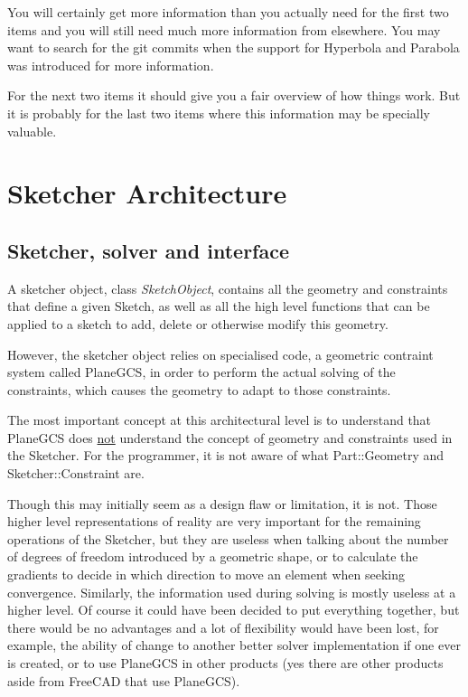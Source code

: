 \documentclass[12pt,twoside,a4paper]{book}
\newcommand{\SketchObject}{\emph{SketchObject}}
\newenvironment{tolerant}[1]{%
  \par\tolerance=#1\relax
}{%
  \par
}
\begin{document}
    You will certainly get more information than you actually need for the first two items and you will still need much more information from elsewhere. You may want to search for the git commits when the support for Hyperbola and Parabola was introduced for more information.

    For the next two items it should give you a fair overview of how things work. But it is probably for the last two items where this information may be specially valuable.

    \chapter{Sketcher Architecture}

    \section{Sketcher, solver and interface}

    A sketcher object, class \SketchObject{}, contains all the geometry and constraints that define a given Sketch, as well as all the high level functions that can be applied to a sketch to add, delete or otherwise modify this geometry.

    However, the sketcher object relies on specialised code, a geometric contraint system called PlaneGCS, in order to perform the actual solving of the constraints, which causes the geometry to adapt to those constraints.

    \begin{tolerant}{500}
    The most important concept at this architectural level is to understand that PlaneGCS does \underline{not} understand the concept of geometry and constraints used in the Sketcher. For the programmer, it is not aware of what Part::Geometry and Sketcher::Constraint are.
    \end{tolerant}

    Though this may initially seem as a design flaw or limitation, it is not. Those higher level representations of reality are very important for the remaining operations of the Sketcher, but they are useless when talking about the number of degrees of freedom introduced by a geometric shape, or to calculate the gradients to decide in which direction to move an element when seeking convergence. Similarly, the information used during solving is mostly useless at a higher level. Of course it could have been decided to put everything together, but there would be no advantages and a lot of flexibility would have been lost, for example, the ability of change to another better solver implementation if one ever is created, or to use PlaneGCS in other products (yes there are other products aside from FreeCAD that use PlaneGCS).
\end{document}
